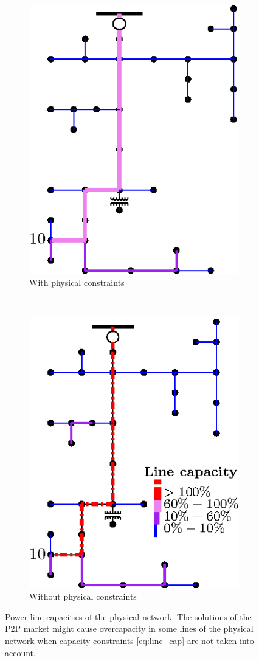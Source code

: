 \documentclass{IEEEtran}  %
\newcommand{\0}{\mathbf{0}}
\newcommand{\1}{\mathbf{1}}
\begin{document}
\begin{figure}[t]
	\centering
	\begin{subfigure}[t]{0.23\textwidth}
		\centering
		\includegraphics[scale=0.9]{figures/simD_safe1}
		\caption{With physical constraints}
	\end{subfigure}%
	~ 
	\begin{subfigure}[t]{0.27\textwidth}
		\centering
		\includegraphics[scale=0.9]{figures/simD_fail1}
		\caption{Without physical constraints}
	\end{subfigure}
	\caption{Power line capacities of the physical network. The solutions of the P2P market might cause overcapacity in some lines of the physical network when capacity constraints \eqref{eq:line_cap} are not taken into account.}
	\label{fig:simD_safe}
\end{figure}
\end{document}
